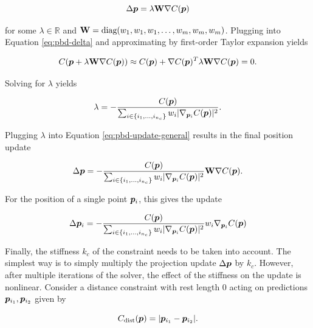 \begin{equation}\label{eq:pbd-update-general}
    \Delta \bm{p} = \lambda \mathbf{W} \nabla C(\bm{p})
\end{equation}

\noindent for some $\lambda \in \mathbb{R}$ and $\mathbf{W} = \text{diag}(w_1, w_1, w_1, \ldots, w_m, w_m, w_m)$. 
Plugging into Equation \ref{eq:pbd-delta} and approximating by first-order Taylor expansion yields

\[
    C(\bm{p} + \lambda \mathbf{W} \nabla C(\bm{p})) \approx C(\bm{p}) + \nabla C(\bm{p})^T \lambda \mathbf{W}
    \nabla C(\bm{p}) = 0.
\]

\noindent Solving for $\lambda$ yields

\begin{equation}\label{eq:pbd-lambda}
    \lambda = -\frac{C(\bm{p})}{\sum_{i \in \{ i_1, \ldots, i_{n_c} \}} w_i \vert \nabla_{\bm{p}_i}C(\bm{p}) \vert^2 }.
\end{equation}

\noindent Plugging $\lambda$ into Equation \ref{eq:pbd-update-general} results in the final position update

\begin{equation}\label{eq:pbd-update}
    \Delta \bm{p} = -\frac{C(\bm{p})}{\sum_{i \in \{ i_1, \ldots, i_{n_c} \}} w_i \vert \nabla_{\bm{p}_i}C(\bm{p}) \vert^2 } 
    \mathbf{W}\nabla C(\bm{p}).
\end{equation}

\noindent For the position of a single point $\bm{p}_i$, this gives the update

\begin{equation}\label{eq:pbd-update-individual}
    \Delta \bm{p}_i = -\frac{C(\bm{p})}{\sum_{i \in \{ i_1, \ldots, i_{n_c} \}} w_i \vert \nabla_{\bm{p}_i}C(\bm{p}) \vert^2 } 
    w_i \nabla_{\bm{p}_i} C(\bm{p})
\end{equation}

Finally, the stiffness $k_c$ of the constraint needs to be taken into account. The simplest way is to simply multiply the projection update
$\Delta \bm{p}$ by $k_c$. However, after multiple iterations of the solver, the effect of the stiffness on the update is nonlinear. Consider
a distance constraint with rest length 0 acting on predictions $\bm{p}_{i_1}, \bm{p}_{i_2}$ given by

\begin{equation}\label{eq:pbd-distance}
    C_{\text{dist}}(\bm{p}) = \vert \bm{p}_{i_1} - \bm{p}_{i_2} \vert.
\end{equation}

